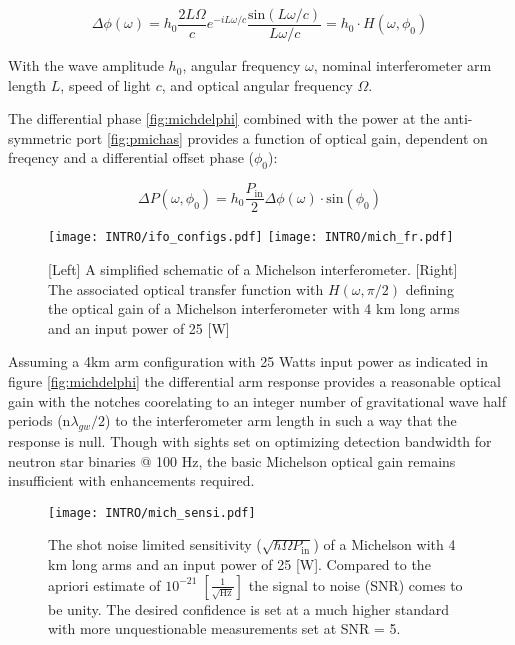 \begin{equation}\label{fig:michdelphi}
	\Delta \phi (\omega) = h_0\frac{2 L \Omega}{c}e^{-i L \omega / c} \frac{\mathrm{sin}(L \omega /c)}{L \omega /c} = h_0 \cdot H(\omega, \phi_0)
\end{equation}

With the wave amplitude $h_0$, angular frequency $\omega$, nominal interferometer arm length $L$, speed of light $c$, and optical angular frequency $\Omega$.

The differential phase \autoref{fig:michdelphi} combined with the power at the anti-symmetric port \autoref{fig:pmichas} provides a function of optical gain, dependent on freqency and a differential offset phase ($\phi_0$):

\begin{equation}
	\Delta P(\omega, \phi_0) = h_0 \frac{P_\mathrm{in}}{2} \Delta \phi (\omega) \cdot \mathrm{sin}(\phi_0)
\end{equation}

\begin{figure}[ht!]
	\begin{subcaptiongroup}
		\texttt{[image: INTRO/ifo\_configs.pdf]}
		\texttt{[image: INTRO/mich\_fr.pdf]}
 	\end{subcaptiongroup}
  	\hfill
	\caption{[Left] A simplified schematic of a Michelson interferometer. [Right] The associated optical transfer function with $H(\omega, \pi/2)$ defining the optical gain of a Michelson interferometer with 4 km long arms and an input power of 25 [W]}
		\label{fig:mich}
\end{figure}
\FloatBarrier

Assuming a 4km arm configuration with 25 Watts input power as indicated in figure \autoref{fig:michdelphi} the differential arm response provides a reasonable optical gain with the notches coorelating to an integer number of gravitational wave half periods ($\mathrm{n}\lambda_{gw} / 2$) to the interferometer arm length in such a way that the response is null. Though with sights set on optimizing detection bandwidth for neutron star binaries @ 100 Hz, the basic Michelson optical gain remains insufficient with enhancements required.  

\begin{figure}[ht!]
	\centering
	\texttt{[image: INTRO/mich\_sensi.pdf]}
	\caption{The shot noise limited sensitivity ($\sqrt{\hbar \Omega P_\mathrm{in}}$) of a Michelson with 4 km long arms and an input power of 25 [W]. Compared to the apriori estimate of $10^{-21} \; [\frac{1}{\sqrt{\mathrm{Hz}}}]$ the signal to noise (SNR) comes to be unity. The desired confidence is set at a much higher standard with more unquestionable measurements set at SNR = 5.}
	\label{fig:michsensitivity}
\end{figure}

